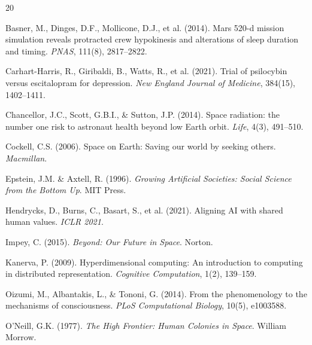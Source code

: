 \documentclass[12pt,a4paper]{article}
\begin{document}



\begin{thebibliography}{20}

Basner, M., Dinges, D.F., Mollicone, D.J., et al. (2014).
Mars 520-d mission simulation reveals protracted crew hypokinesis and alterations of sleep duration and timing.
\textit{PNAS}, 111(8), 2817--2822.

Carhart-Harris, R., Giribaldi, B., Watts, R., et al. (2021).
Trial of psilocybin versus escitalopram for depression.
\textit{New England Journal of Medicine}, 384(15), 1402--1411.

Chancellor, J.C., Scott, G.B.I., \& Sutton, J.P. (2014).
Space radiation: the number one risk to astronaut health beyond low Earth orbit.
\textit{Life}, 4(3), 491--510.

Cockell, C.S. (2006).
Space on Earth: Saving our world by seeking others.
\textit{Macmillan}.

Epstein, J.M. \& Axtell, R. (1996).
\textit{Growing Artificial Societies: Social Science from the Bottom Up}.
MIT Press.

Hendrycks, D., Burns, C., Basart, S., et al. (2021).
Aligning AI with shared human values.
\textit{ICLR 2021}.

Impey, C. (2015).
\textit{Beyond: Our Future in Space}.
Norton.

Kanerva, P. (2009).
Hyperdimensional computing: An introduction to computing in distributed representation.
\textit{Cognitive Computation}, 1(2), 139--159.

Oizumi, M., Albantakis, L., \& Tononi, G. (2014).
From the phenomenology to the mechanisms of consciousness.
\textit{PLoS Computational Biology}, 10(5), e1003588.

O'Neill, G.K. (1977).
\textit{The High Frontier: Human Colonies in Space}.
William Morrow.


\end{thebibliography}
\end{document}
